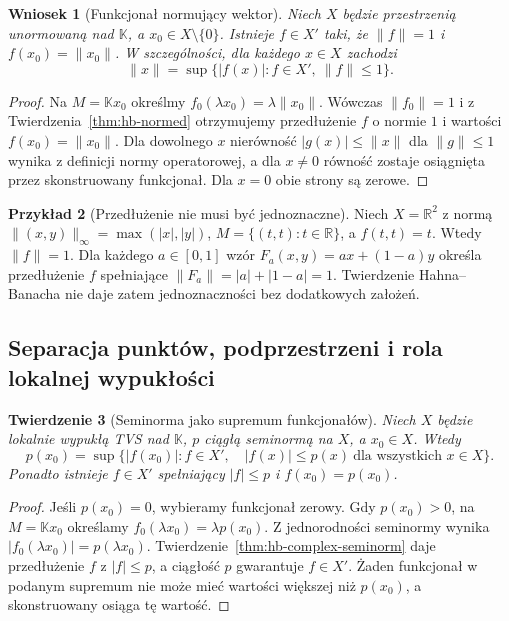 \documentclass[11pt,a4paper]{article}
\numberwithin{equation}{section}
\theoremstyle{plain}
\newtheorem{twierdzenie}{Twierdzenie}[section]
\newtheorem{wniosek}[twierdzenie]{Wniosek}
\theoremstyle{definition}
\newtheorem{przyklad}[twierdzenie]{Przykład}
\theoremstyle{remark}
\newcommand{\R}{\mathbb R}
\newcommand{\K}{\mathbb K}
\begin{document}
\begin{wniosek}[Funkcjonał normujący wektor]\label{cor:norming}
Niech $X$ będzie przestrzenią unormowaną nad $\K$,
a $x_0\in X\setminus\{0\}$. Istnieje $f\in X'$
taki, że $\|f\|=1$ i $f(x_0)=\|x_0\|$.
W szczególności, dla każdego $x\in X$ zachodzi
\[
 \|x\|=\sup\bigl\{|f(x)|:f\in X',\ \|f\|\le1\bigr\}.
\]
\end{wniosek}
\begin{proof}
Na $M=\K x_0$ określmy
$f_0(\lambda x_0)=\lambda\|x_0\|$.
Wówczas $\|f_0\|=1$ i z
Twierdzenia~\ref{thm:hb-normed} otrzymujemy przedłużenie
$f$ o normie $1$ i wartości $f(x_0)=\|x_0\|$.
Dla dowolnego $x$ nierówność $|g(x)|\le\|x\|$
dla $\|g\|\le1$ wynika z definicji normy operatorowej,
a dla $x\ne0$ równość zostaje osiągnięta przez
skonstruowany funkcjonał. Dla $x=0$ obie strony są zerowe.
\end{proof}

\begin{przyklad}[Przedłużenie nie musi być jednoznaczne]
Niech $X=\R^2$ z normą $\|(x,y)\|_\infty
=\max(|x|,|y|)$, $M=\{(t,t):t\in\R\}$, a
$f(t,t)=t$. Wtedy $\|f\|=1$. Dla każdego
$a\in[0,1]$ wzór
$F_a(x,y)=a x+(1-a)y$ określa przedłużenie $f$
spełniające $\|F_a\|=|a|+|1-a|=1$.
Twierdzenie Hahna--Banacha nie daje zatem
jednoznaczności bez dodatkowych założeń.
\end{przyklad}

\subsection{Separacja punktów, podprzestrzeni i rola lokalnej wypukłości}

\begin{twierdzenie}[Seminorma jako supremum funkcjonałów]
\label{thm:seminorm-as-sup}
Niech $X$ będzie lokalnie wypukłą TVS nad $\K$,
$p$ ciągłą seminormą na $X$, a $x_0\in X$.
Wtedy
\[
 p(x_0)=\sup\bigl\{|f(x_0)|:f\in X',\quad
 |f(x)|\le p(x)\ \text{dla wszystkich }x\in X\bigr\}.
\]
Ponadto istnieje $f\in X'$ spełniający $|f|\le p$
i $f(x_0)=p(x_0)$.
\end{twierdzenie}
\begin{proof}
Jeśli $p(x_0)=0$, wybieramy funkcjonał zerowy.
Gdy $p(x_0)>0$, na $M=\K x_0$ określamy
$f_0(\lambda x_0)=\lambda p(x_0)$.
Z jednorodności seminormy wynika
$|f_0(\lambda x_0)|=p(\lambda x_0)$.
Twierdzenie~\ref{thm:hb-complex-seminorm} daje
przedłużenie $f$ z $|f|\le p$, a ciągłość $p$
gwarantuje $f\in X'$. Żaden funkcjonał w podanym
supremum nie może mieć wartości większej niż $p(x_0)$,
a skonstruowany osiąga tę wartość.
\end{proof}
\end{document}
